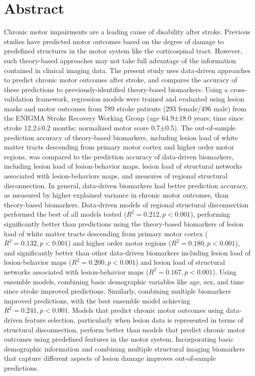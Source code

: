 \documentclass[10pt]{article}
\begin{document}
\section{Abstract}
Chronic motor impairments are a leading cause of disability after stroke. Previous studies have predicted motor outcomes based on the degree of damage to predefined structures in the motor system like the corticospinal tract. However, such theory-based approaches may not take full advantage of the information contained in clinical imaging data. The present study uses data-driven approaches to predict chronic motor outcomes after stroke, and compares the accuracy of these predictions to previously-identified theory-based biomarkers. Using a cross-validation framework, regression  models were trained and evaluated using lesion masks and motor outcomes from 789 stroke patients (293 female/496 male) from the ENIGMA Stroke Recovery Working Group (age 64.9±18.0 years; time since stroke 12.2±0.2 months; normalized motor score 0.7±0.5). The out-of-sample prediction accuracy of theory-based biomarkers, including lesion load of white matter tracts descending from primary motor cortex and higher order motor regions, was compared to the prediction accuracy of data-driven biomarkers, including lesion load of lesion-behavior maps, lesion load of structural networks associated with lesion-behaviors maps, and measures of regional structural disconnection. In general, data-driven biomarkers had better prediction accuracy, as measured by higher explained variance in chronic motor outcomes, than theory-based biomarkers. Data-driven models of regional structural disconnection performed the best of all models tested ($R^2 = 0.212, p < 0.001$), performing significantly better than predictions using the theory-based biomarkers of lesion load of white matter tracts descending from primary motor cortex ($R^2 = 0.132, p < 0.001$) and higher order motor regions ($R^2 = 0.180, p < 0.001$), and significantly better than other data-driven biomarkers including  lesion load of lesion-behavior maps ($R^2 = 0.200, p < 0.001$) and lesion load of structural networks associated with lesion-behavior maps ($R^2 = 0.167, p < 0.001$). Using ensemble models, combining basic demographic variables like age, sex, and time since stroke improved predictions. Similarly, combining multiple biomarkers improved predictions, with the best ensemble model achieving $R^2 = 0.241, p < 0.001$. Models that predict chronic motor outcomes using data-driven feature selection, particularly when lesion data is represented in terms of structural disconnection, perform better than models that predict chronic motor outcomes using predefined features in the motor system. Incorporating basic demographic information and combining multiple structural imaging biomarkers that capture different aspects of lesion damage improves out-of-sample predictions.
\end{document}
